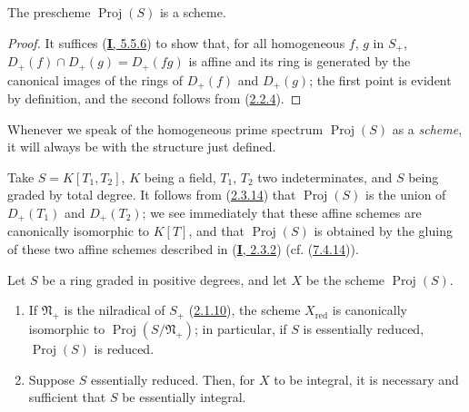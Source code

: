 \begin{proposition}[2.4.2]
\label{II.2.4.2}
The prescheme $\operatorname{Proj}(S)$ is a scheme.
\end{proposition}

\begin{proof}
It suffices (\hyperref[I.5.5.6]{\textbf{I}, 5.5.6}) to show that, for all
homogeneous $f$, $g$ in $S_+$,
$D_+(f)\cap D_+(g)=D_+(fg)$ is affine and its ring is generated by
the canonical images of the rings of $D_+(f)$ and $D_+(g)$; the first
point is evident by definition, and the second follows from
(\hyperref[II.2.2.4]{2.2.4}).
\end{proof}
Whenever we speak of the homogeneous prime spectrum $\operatorname{Proj}(S)$
as a \emph{scheme}, it will always be with the structure just
defined.

\begin{example}[2.4.3]
\label{II.2.4.3}
Take $S=K[T_1,T_2]$, $K$ being a field, $T_1$, $T_2$ two
indeterminates, and $S$ being graded by total degree. It follows from
(\hyperref[II.2.3.14]{2.3.14}) that $\operatorname{Proj}(S)$ is the
union of $D_+(T_1)$ and $D_+(T_2)$; we see immediately that these affine
schemes are canonically isomorphic to $K[T]$, and that
$\operatorname{Proj}(S)$ is obtained by the gluing of these two affine
schemes described in (\hyperref[I.2.3.2]{\textbf{I}, 2.3.2}) (cf.
(\hyperref[II.7.4.14]{7.4.14})).
\end{example}

\begin{proposition}[2.4.4]
\label{II.2.4.4}
Let $S$ be a ring graded in positive degrees, and let $X$ be the scheme
$\operatorname{Proj}(S)$.
\begin{enumerate}
  \item[\rm(i)] If $\mathfrak{N}_+$ is the nilradical of $S_+$
    \textup{(\hyperref[II.2.1.10]{2.1.10})}, the scheme $X_{\mathrm{red}}$ is
    canonically isomorphic to $\operatorname{Proj}(S/\mathfrak{N}_+)$; in
    particular, if $S$ is essentially reduced,
    $\operatorname{Proj}(S)$ is reduced.
  \item[\rm(ii)] Suppose $S$ essentially reduced. Then, for $X$ to be
    integral, it is necessary and sufficient that $S$ be essentially
    integral.
\end{enumerate}
\end{proposition}

